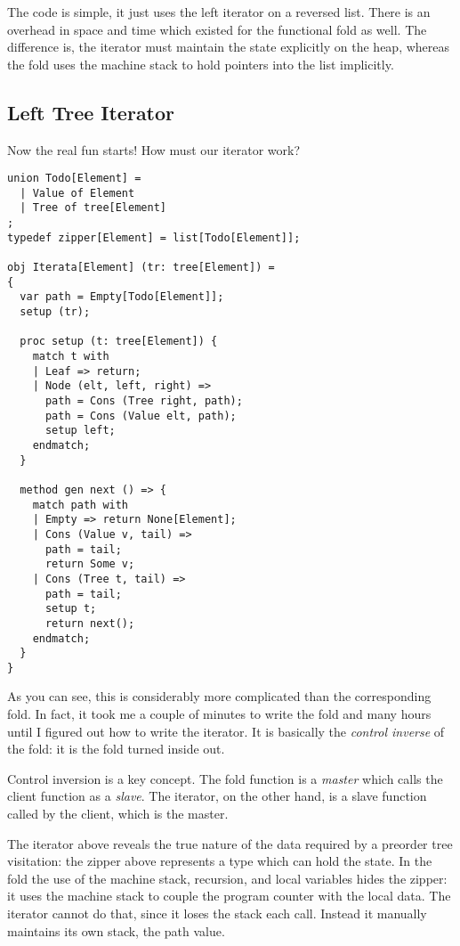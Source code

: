 \documentclass[oneside]{book}
\begin{document}
The code is simple, it just uses the left iterator
on a reversed list. There is an overhead in space and
time which existed for the functional fold as well.
The difference is, the iterator must maintain the state
explicitly on the heap, whereas the fold uses the machine
stack to hold pointers into the list implicitly.

\subsection{Left Tree Iterator}
Now the real fun starts! How must our iterator work?

\begin{verbatim}
union Todo[Element] = 
  | Value of Element
  | Tree of tree[Element]
;
typedef zipper[Element] = list[Todo[Element]];

obj Iterata[Element] (tr: tree[Element]) =
{
  var path = Empty[Todo[Element]];
  setup (tr);

  proc setup (t: tree[Element]) {
    match t with
    | Leaf => return;
    | Node (elt, left, right) =>
      path = Cons (Tree right, path);
      path = Cons (Value elt, path);
      setup left;
    endmatch; 
  }

  method gen next () => {
    match path with
    | Empty => return None[Element];
    | Cons (Value v, tail) =>
      path = tail;
      return Some v;
    | Cons (Tree t, tail) =>
      path = tail;
      setup t;
      return next();
    endmatch;
  }
}
\end{verbatim}

As you can see, this is considerably more complicated than the corresponding fold.
In fact, it took me a couple of minutes to write the fold and many hours
until I figured out how to write the iterator. It is basically the
{\em control inverse} of the fold: it is the fold turned inside out.

Control inversion is a key concept. The fold function is a {\em master} which
calls the client function as a {\em slave}. The iterator, on the other hand,
is a slave function called by the client, which is the master.

The iterator above reveals the true nature of the data required by a preorder
tree visitation: the zipper above represents a type which can hold the state.
In the fold the use of the machine stack, recursion, and local variables
hides the zipper: it uses the machine stack to couple the program counter with
the local data. The iterator cannot do that, since it loses the stack each
call. Instead it manually maintains its own stack, the path value.
\end{document}
